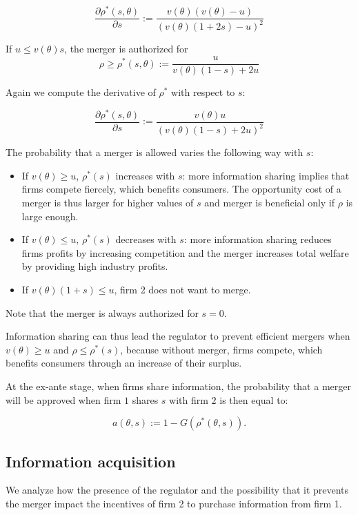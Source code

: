 \documentclass[a4paper,leqno]{article}%
\renewcommand{\t}{\theta}
\begin{document}
\[
\frac{\partial \rho^{*}(s,\t)}{\partial s}:=\frac{v(\t)(v(\t)-u)}{(v(\t)(1+2s)-u)^2}
\]
    
If $u\leq v(\t)s$, the merger is authorized for 
    \begin{equation}
           \rho\geq \rho^*(s,\t):=\frac{u}{v(\t)(1-s)+2u}
    \end{equation}

Again we compute the derivative of $\rho^*$ with respect to $s$:

\[
    \frac{\partial \rho^{*}(s,\t)}{\partial s}:=\frac{v(\t)u}{(v(\t)(1-s)+2u)^2}
\]

The probability that a merger is allowed varies the following way with $s$:

\begin{itemize}
    \item If $v(\t)\geq u$, $\rho^*(s)$ increases with $s$: more information sharing implies that firms compete fiercely, which benefits consumers. The opportunity cost of a merger is thus larger for higher values of $s$ and merger is beneficial only if $\rho$ is large enough.
    \item If $v(\t)\leq u$, $\rho^*(s)$ decreases with $s$: more information sharing reduces firms profits by increasing competition and the merger increases total welfare by providing high industry profits.
    \item If $v(\t)(1+s)\leq u$, firm 2 does not want to merge.
\end{itemize}

Note that the merger is always authorized for $s=0$.

\medskip

Information sharing can thus lead the regulator to prevent efficient mergers when $v(\t)\geq u$ and $\rho \leq \rho^*(s)$, because without merger, firms compete, which benefits consumers through an increase of their surplus. 

\medskip

At the ex-ante stage, when firms share information, the probability that a merger will be approved when firm $1$ shares $s$ with firm $2$ is then equal to:

\[
a(\t,s):=1-G(\rho^*(\t,s)).
\]


\subsection{Information acquisition}

We analyze how the presence of the regulator and the possibility that it prevents the merger impact the incentives of firm 2 to purchase information from firm 1.
\end{document}
